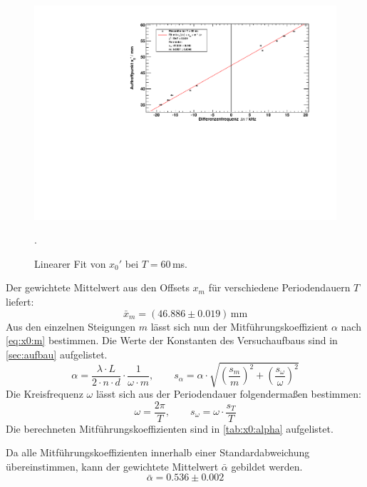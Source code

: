 \begin{figure}[H]
\begin{center}
  \includegraphics[width=\textwidth]{../img/fit_T_60ms.pdf}
  \caption{Linearer Fit von $x_0'$ bei $T = 60$\,ms.}.
  \label{img:fit:x0:60ms}
\end{center}
\end{figure}



Der gewichtete Mittelwert aus den Offsets $x_m$ für verschiedene Periodendauern $T$ liefert:
\begin{equation}
  \label{eq:xm}
  \bar{x}_{m} = (46.886 \pm 0.019)\,\text{mm}
\end{equation}
Aus den einzelnen Steigungen $m$ lässt sich nun der Mitführungskoeffizient $\alpha$ nach \autoref{eq:x0:m} bestimmen. Die Werte der Konstanten des 
Versuchaufbaus sind in \autoref{sec:aufbau} aufgelistet.
\begin{equation}
  \alpha = \frac{\lambda \cdot L}{2 \cdot n \cdot d} \cdot \frac{1}{\omega \cdot m}, \qquad
  s_{\alpha} = \alpha \cdot \sqrt{\left(\frac{s_m}{m}\right)^2 + \left(\frac{s_\omega}{\omega}\right)^2}
\end{equation}
Die Kreisfrequenz $\omega$ lässt sich aus der Periodendauer folgendermaßen bestimmen:
\begin{equation}
  \label{eq:omega}
  \omega = \frac{2 \pi}{T}, \qquad s_{\omega} = \omega \cdot \frac{s_T}{T}
\end{equation}
Die berechneten Mitführungskoeffizienten sind in \autoref{tab:x0:alpha} aufgelistet.

Da alle Mitführungskoeffizienten innerhalb einer Standardabweichung übereinstimmen, kann der gewichtete Mittelwert $\bar{\alpha}$ gebildet werden.
\begin{equation}
  \label{eq:x0:alpha:avg}
  \bar{\alpha} = 0.536 \pm 0.002
\end{equation}

